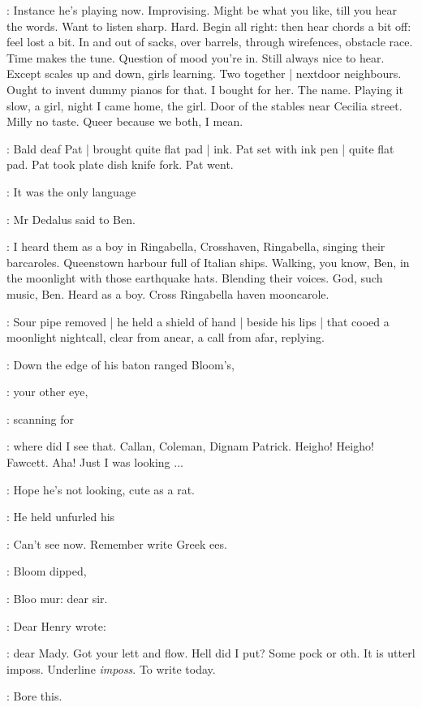 \BloomInt:
Instance he's playing now.
Improvising.
Might be what you like,
till you hear the words.
Want to listen sharp.
Hard.
Begin all right:
then hear chords a bit off:
feel lost a bit.
In and out of sacks,
over barrels,
through wirefences,
obstacle race.
Time makes the tune.
Question of mood you're in.
Still always nice to hear.
Except scales up and down,
girls learning.
Two together |
nextdoor neighbours.
Ought to invent dummy pianos for that.
I bought for her.
The name.
Playing it slow,
a girl,
night I came home,
the girl.
Door of the stables near Cecilia street.
Milly no taste.
Queer because we both,
I mean.

:
Bald deaf Pat |
brought quite flat pad |
ink.
Pat set with ink pen |
quite flat pad.
Pat took plate dish knife fork.
Pat went.

\simon:
It was the only language

:
Mr Dedalus said to Ben.

\simon:
I heard them as a boy in Ringabella,
Crosshaven,
Ringabella,
singing their barcaroles.
Queenstown harbour full of Italian ships.
Walking,
you know,
Ben,
in the moonlight with those earthquake hats.
Blending their voices.
God,
such music,
Ben.
Heard as a boy.
Cross Ringabella haven mooncarole.

:
Sour pipe removed |
he held a shield of hand |
beside his lips |
that cooed a moonlight nightcall,
clear from anear,
a call from afar,
replying.

:
Down the edge of his  baton ranged Bloom's,

:
your other eye,

:
scanning for

\BloomInt:
where did I see that.
Callan,
Coleman,
Dignam Patrick.
Heigho!
Heigho!
Fawcett.
Aha!
Just I was looking ...

\BloomInt:
Hope he's not looking,
cute as a rat.

:
He held unfurled his 

\BloomInt:
Can't see now.
Remember write Greek ees.

:
Bloom dipped,

\BloomInt:
Bloo mur:
dear sir.

:
Dear Henry wrote:

\BloomInt:
dear Mady.
Got your lett and flow.
Hell did I put?
Some pock or oth.
It is utterl imposs.
Underline \emph{imposs}.
To write today.

\BloomInt:
Bore this.

